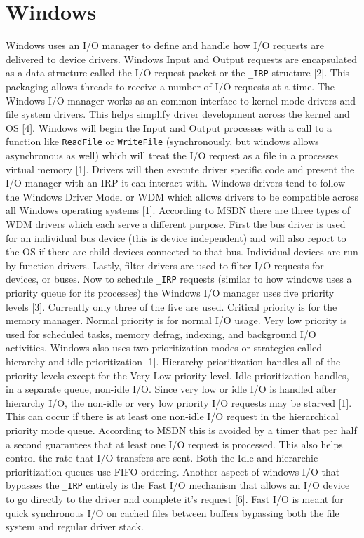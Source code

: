 \documentclass[letterpaper,10pt,titlepage,draftclsnofoot,onecolumn]{IEEEtran}
\begin{document}
\section{Windows}
Windows uses an I/O manager to define and handle how I/O requests are delivered to device drivers. Windows Input and Output requests are encapsulated as a data structure called the I/O request packet or the \texttt{\_IRP} structure [2]. This packaging allows threads to receive a number of I/O requests at a time. The Windows I/O manager works as an common interface to kernel mode drivers and file system drivers. This helps simplify driver development across the kernel and OS [4]. Windows will begin the Input and Output processes with a call to a function like \texttt{ReadFile} or \texttt{WriteFile} (synchronously, but windows allows asynchronous as well) which will treat the I/O request as a file in a processes virtual memory [1]. Drivers will then execute driver specific code and present the I/O manager with an IRP it can interact with. Windows drivers tend to follow the Windows Driver Model or WDM which allows drivers to be compatible across all Windows operating systems [1]. According to MSDN there are three types of WDM drivers which each serve a different purpose. First the bus driver is used for an individual bus device (this is device independent) and will also report to the OS if there are child devices connected to that bus. Individual devices are run by function drivers. Lastly, filter drivers are used to filter I/O requests for devices, or buses. Now to schedule \texttt{\_IRP} requests (similar to how windows uses a priority queue for its processes) the Windows I/O manager uses five priority levels [3]. Currently only three of the five are used. Critical priority is for the memory manager. Normal priority is for normal I/O usage. Very low priority is used for scheduled tasks, memory defrag, indexing, and background I/O activities. Windows also uses two prioritization modes or strategies called hierarchy and idle prioritization [1]. Hierarchy prioritization handles all of the priority levels except for the Very Low priority level. Idle prioritization handles, in a separate queue, non-idle I/O. Since very low or idle I/O is handled after hierarchy I/O, the non-idle or very low priority I/O requests may be starved [1]. This can occur if there is at least one non-idle I/O request in the hierarchical priority mode queue. According to MSDN this is avoided by a timer that per half a second guarantees that at least one I/O request is processed. This also helps control the rate that I/O transfers are sent. Both the Idle and hierarchic prioritization queues use FIFO ordering. Another aspect of windows I/O that bypasses the \texttt{\_IRP} entirely is the Fast I/O mechanism that allows an I/O device to go directly to the driver and complete it's request [6]. Fast I/O is meant for quick synchronous I/O on cached files between buffers bypassing both the file system and regular driver stack.
\end{document}
